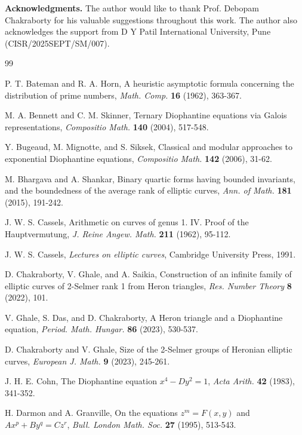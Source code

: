 \documentclass[10pt]{article}
\begin{document}
\noindent\textbf{Acknowledgments.} The author would like to thank Prof. Debopam Chakraborty for his valuable suggestions throughout this work. The author also acknowledges the support from D Y Patil International University, Pune (CISR/2025SEPT/SM/007).

\begin{thebibliography}{99}

 P. T. Bateman and R. A. Horn, A heuristic asymptotic formula concerning the distribution of prime numbers, \textit{Math. Comp.} \textbf{16} (1962), 363-367.

 M. A. Bennett and C. M. Skinner, Ternary Diophantine equations via Galois representations, \textit{Compositio Math.} \textbf{140} (2004), 517-548.

 Y. Bugeaud, M. Mignotte, and S. Siksek, Classical and modular approaches to exponential Diophantine equations, \textit{Compositio Math.} \textbf{142} (2006), 31-62.

 M. Bhargava and A. Shankar, Binary quartic forms having bounded invariants, and the boundedness of the average rank of elliptic curves, \textit{Ann. of Math.} \textbf{181} (2015), 191-242.

 J. W. S. Cassels, Arithmetic on curves of genus 1. IV. Proof of the Hauptvermutung, \textit{J. Reine Angew. Math.} \textbf{211} (1962), 95-112.

 J. W. S. Cassels, \textit{Lectures on elliptic curves}, Cambridge University Press, 1991.

 D. Chakraborty, V. Ghale, and A. Saikia, Construction of an infinite family of elliptic curves of 2-Selmer rank 1 from Heron triangles, \textit{Res. Number Theory} \textbf{8} (2022), 101.

 V. Ghale, S. Das, and D. Chakraborty, A Heron triangle and a Diophantine equation, \textit{Period. Math. Hungar.} \textbf{86} (2023), 530-537.

 D. Chakraborty and V. Ghale, Size of the 2-Selmer groups of Heronian elliptic curves, \textit{European J. Math.} \textbf{9} (2023), 245-261.

 J. H. E. Cohn, The Diophantine equation \(x^{4} - Dy^{2} = 1\), \textit{Acta Arith.} \textbf{42} (1983), 341-352.

 H. Darmon and A. Granville, On the equations \(z^{m} = F(x,y)\) and \(Ax^{p} + By^{q} = Cz^{r}\), \textit{Bull. London Math. Soc.} \textbf{27} (1995), 513-543.


\end{thebibliography}
\end{document}
